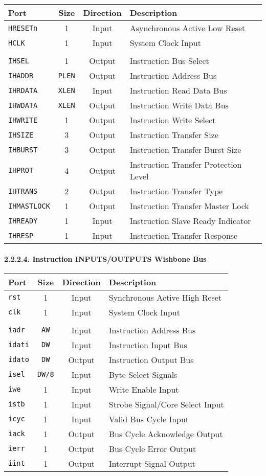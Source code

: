 \documentclass[]{article}
\let\oldparagraph\paragraph
\renewcommand{\paragraph}[1]{\oldparagraph{#1}\mbox{}}
\begin{document}
\begin{longtable}[]{@{}lccl@{}}
\toprule
Port & Size & Direction & Description\tabularnewline
\midrule
\endhead
\texttt{HRESETn} & 1 & Input & Asynchronous Active Low
Reset\tabularnewline
\texttt{HCLK} & 1 & Input & System Clock Input\tabularnewline
& & &\tabularnewline
\texttt{IHSEL} & 1 & Output & Instruction Bus Select\tabularnewline
\texttt{IHADDR} & \texttt{PLEN} & Output & Instruction Address
Bus\tabularnewline
\texttt{IHRDATA} & \texttt{XLEN} & Input & Instruction Read Data
Bus\tabularnewline
\texttt{IHWDATA} & \texttt{XLEN} & Output & Instruction Write Data
Bus\tabularnewline
\texttt{IHWRITE} & 1 & Output & Instruction Write Select\tabularnewline
\texttt{IHSIZE} & 3 & Output & Instruction Transfer Size\tabularnewline
\texttt{IHBURST} & 3 & Output & Instruction Transfer Burst
Size\tabularnewline
\texttt{IHPROT} & 4 & Output & Instruction Transfer Protection
Level\tabularnewline
\texttt{IHTRANS} & 2 & Output & Instruction Transfer Type\tabularnewline
\texttt{IHMASTLOCK} & 1 & Output & Instruction Transfer Master
Lock\tabularnewline
\texttt{IHREADY} & 1 & Input & Instruction Slave Ready
Indicator\tabularnewline
\texttt{IHRESP} & 1 & Input & Instruction Transfer
Response\tabularnewline
\bottomrule
\end{longtable}

\hypertarget{instruction-inputsoutputs-wishbone-bus}{%
\paragraph{2.2.2.4. Instruction INPUTS/OUTPUTS Wishbone
Bus}\label{instruction-inputsoutputs-wishbone-bus}}

\begin{longtable}[]{@{}lccl@{}}
\toprule
Port & Size & Direction & Description\tabularnewline
\midrule
\endhead
\texttt{rst} & 1 & Input & Synchronous Active High Reset\tabularnewline
\texttt{clk} & 1 & Input & System Clock Input\tabularnewline
& & &\tabularnewline
\texttt{iadr} & \texttt{AW} & Input & Instruction Address
Bus\tabularnewline
\texttt{idati} & \texttt{DW} & Input & Instruction Input
Bus\tabularnewline
\texttt{idato} & \texttt{DW} & Output & Instruction Output
Bus\tabularnewline
\texttt{isel} & \texttt{DW/8} & Input & Byte Select
Signals\tabularnewline
\texttt{iwe} & 1 & Input & Write Enable Input\tabularnewline
\texttt{istb} & 1 & Input & Strobe Signal/Core Select
Input\tabularnewline
\texttt{icyc} & 1 & Input & Valid Bus Cycle Input\tabularnewline
\texttt{iack} & 1 & Output & Bus Cycle Acknowledge Output\tabularnewline
\texttt{ierr} & 1 & Output & Bus Cycle Error Output\tabularnewline
\texttt{iint} & 1 & Output & Interrupt Signal Output\tabularnewline
\bottomrule
\end{longtable}
\end{document}
